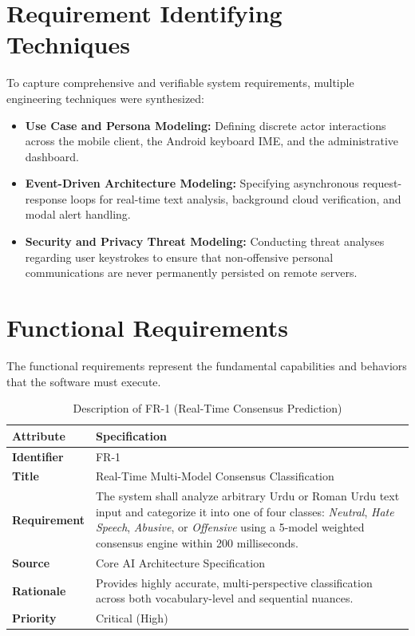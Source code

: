 \documentclass[A4paper,12pt]{report}
\theoremstyle{plain}
\theoremstyle{definition}
\theoremstyle{remark}
\numberwithin{equation}{section}
\begin{document}
\section{Requirement Identifying Techniques}
To capture comprehensive and verifiable system requirements, multiple engineering techniques were synthesized:
\begin{itemize}[leftmargin=*]
    \item \textbf{Use Case and Persona Modeling:} Defining discrete actor interactions across the mobile client, the Android keyboard IME, and the administrative dashboard.
    \item \textbf{Event-Driven Architecture Modeling:} Specifying asynchronous request-response loops for real-time text analysis, background cloud verification, and modal alert handling.
    \item \textbf{Security and Privacy Threat Modeling:} Conducting threat analyses regarding user keystrokes to ensure that non-offensive personal communications are never permanently persisted on remote servers.
\end{itemize}

\section{Functional Requirements}
The functional requirements represent the fundamental capabilities and behaviors that the software must execute.

\begin{table}[H]
\centering
\caption{Description of FR-1 (Real-Time Consensus Prediction)}
\renewcommand{\arraystretch}{1.3}
\begin{tabular}{|p{3.5cm}|p{10.5cm}|}
\hline
\textbf{Attribute} & \textbf{Specification} \\ \hline
\textbf{Identifier} & FR-1 \\ \hline
\textbf{Title} & Real-Time Multi-Model Consensus Classification \\ \hline
\textbf{Requirement} & The system shall analyze arbitrary Urdu or Roman Urdu text input and categorize it into one of four classes: \textit{Neutral}, \textit{Hate Speech}, \textit{Abusive}, or \textit{Offensive} using a 5-model weighted consensus engine within 200 milliseconds. \\ \hline
\textbf{Source} & Core AI Architecture Specification \\ \hline
\textbf{Rationale} & Provides highly accurate, multi-perspective classification across both vocabulary-level and sequential nuances. \\ \hline
\textbf{Priority} & Critical (High) \\ \hline
\end{tabular}
\end{table}
\end{document}
